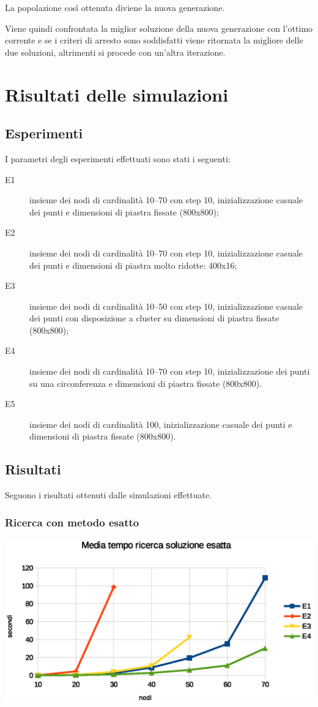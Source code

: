 \documentclass[a4paper]{article}
\begin{document}
            La popolazione cos\`i ottenuta diviene la nuova generazione.
            
            Viene quindi confrontata la miglior soluzione della nuova generazione con l'ottimo corrente e se i criteri di arresto sono soddisfatti viene ritornata la migliore delle due soluzioni,
            altrimenti si procede con un'altra iterazione.
\newpage
    \section{Risultati delle simulazioni}
        
        \subsection{Esperimenti}
        I parametri degli esperimenti effettuati sono stati i seguenti:
        \begin{description}
            \item[E1] insieme dei nodi di cardinalit\`a 10--70 con step 10, inizializzazione casuale dei punti e dimensioni di piastra fissate (800x800);
            \item[E2] insieme dei nodi di cardinalit\`a 10--70 con step 10, inizializzazione casuale dei punti e dimensioni di piastra molto ridotte: 400x16;
            \item[E3] insieme dei nodi di cardinalit\`a 10--50 con step 10, inizializzazione casuale dei punti con disposizione a cluster su dimensioni di piastra fissate (800x800);
            \item[E4] insieme dei nodi di cardinalit\`a 10--70 con step 10, inizializzazione dei punti su una circonferenza e dimensioni di piastra fissate (800x800).
            \item[E5] insieme dei nodi di cardinalit\`a 100, inizializzazione casuale dei punti e dimensioni di piastra fissate (800x800).
        \end{description}

        \subsection{Risultati}
            Seguono i risultati ottenuti dalle simulazioni effettuate.
            \subsubsection{Ricerca con metodo esatto}

                \includegraphics[scale=0.7]{img/exavgtime}
\end{document}
